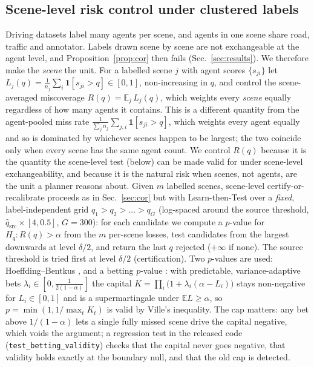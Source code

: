 \subsection{Scene-level risk control under clustered labels}\label{sec:scene}
Driving datasets label many agents per scene, and agents in one scene share road, traffic and annotator. Labels drawn scene by scene are not
exchangeable at the agent level, and Proposition~\ref{prop:cor} then fails (Sec.~\ref{sec:results}). We therefore make the \emph{scene} the unit.
For a labelled scene $j$ with agent scores $\{s_{ji}\}$ let $L_j(q)=\frac1{n_j}\sum_i\mathbf 1[s_{ji}>q]\in[0,1]$, non-increasing in $q$, and
control the scene-averaged miscoverage $R(q)=\mathbb E_j\,L_j(q)$, which weights every \emph{scene} equally regardless of
how many agents it contains. This is a different quantity from the agent-pooled miss rate $\frac1{\sum_j n_j}\sum_{j,i}\mathbf
1[s_{ji}>q]$, which weights every agent equally and so is dominated by whichever scenes happen to be largest; the two
coincide only when every scene has the same agent count. We control $R(q)$ because it is the quantity the scene-level
test (below) can be made valid for under scene-level exchangeability, and because it is the natural risk when scenes,
not agents, are the unit a planner reasons about. Given $m$ labelled scenes, scene-level certify-or-recalibrate
proceeds as in Sec.~\ref{sec:cor} but with Learn-then-Test \cite{angelopoulos2025ltt} over a \emph{fixed}, label-independent grid
$q_1>q_2>\dots>q_G$ (log-spaced around the source threshold, $\hat q_{\mathrm{src}}\times[4,0.5]$, $G=300$): for each candidate we compute a $p$-value for
$H_{q}:R(q)>\alpha$ from the $m$ per-scene losses, test candidates from the largest downwards at level $\delta/2$, and return the last $q$ rejected
($+\infty$ if none). The source threshold is tried first at level $\delta/2$ (certification). Two $p$-values are used:
Hoeffding--Bentkus \cite{bates2021rcps}, and a betting $p$-value \cite{waudbysmith2024betting}: with predictable, variance-adaptive bets
$\lambda_i\in[0,\tfrac{1}{2(1-\alpha)}]$ the capital $K=\prod_i\big(1+\lambda_i(\alpha-L_i)\big)$ stays non-negative for $L_i\in[0,1]$ and is a
supermartingale under $\mathbb E L\ge\alpha$, so $p=\min(1,1/\max_tK_t)$ is valid by Ville's inequality. The cap matters: any bet above
$1/(1-\alpha)$ lets a single fully missed scene drive the capital negative, which voids the argument; a regression test in the released code (\texttt{test\_betting\_validity}) checks that the capital never goes negative, that validity holds exactly at the boundary null, and that the old cap is detected.
